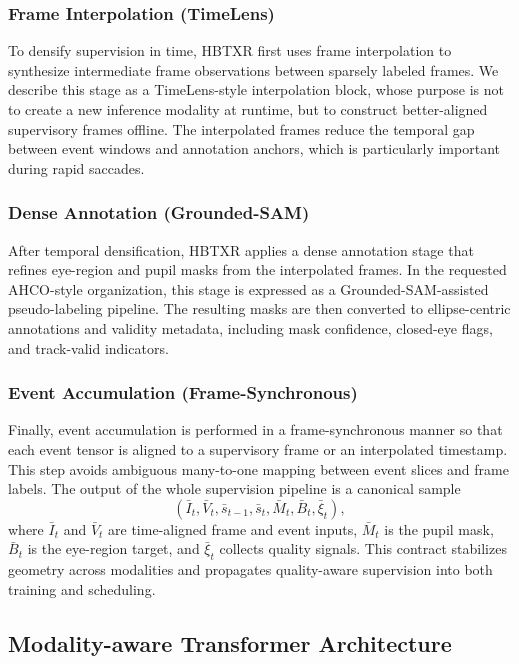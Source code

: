 \documentclass[journal]{IEEEtran}
\begin{document}
\subsubsection{Frame Interpolation (TimeLens)}
To densify supervision in time, HBTXR first uses frame interpolation to synthesize intermediate frame observations between sparsely labeled frames. We describe this stage as a TimeLens-style interpolation block, whose purpose is not to create a new inference modality at runtime, but to construct better-aligned supervisory frames offline. The interpolated frames reduce the temporal gap between event windows and annotation anchors, which is particularly important during rapid saccades.

\subsubsection{Dense Annotation (Grounded-SAM)}
After temporal densification, HBTXR applies a dense annotation stage that refines eye-region and pupil masks from the interpolated frames. In the requested AHCO-style organization, this stage is expressed as a Grounded-SAM-assisted pseudo-labeling pipeline. The resulting masks are then converted to ellipse-centric annotations and validity metadata, including mask confidence, closed-eye flags, and track-valid indicators.

\subsubsection{Event Accumulation (Frame-Synchronous)}
Finally, event accumulation is performed in a frame-synchronous manner so that each event tensor is aligned to a supervisory frame or an interpolated timestamp. This step avoids ambiguous many-to-one mapping between event slices and frame labels. The output of the whole supervision pipeline is a canonical sample
\begin{equation}
(\bar I_t, \bar V_t, \bar s_{t-1}, \bar s_t, \bar M_t, \bar B_t, \bar\xi_t),
\end{equation}
where $\bar I_t$ and $\bar V_t$ are time-aligned frame and event inputs, $\bar M_t$ is the pupil mask, $\bar B_t$ is the eye-region target, and $\bar\xi_t$ collects quality signals. This contract stabilizes geometry across modalities and propagates quality-aware supervision into both training and scheduling.

\subsection{Modality-aware Transformer Architecture}
\end{document}
